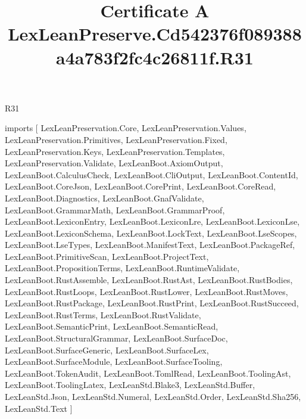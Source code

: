 \begin{lexlean}{R31}
\title{Certificate A LexLeanPreserve.Cd542376f089388a4a783f2fc4c26811f.R31}
\begin{coremodule}
imports [
  LexLeanPreservation.Core,
  LexLeanPreservation.Values,
  LexLeanPreservation.Primitives,
  LexLeanPreservation.Fixed,
  LexLeanPreservation.Keys,
  LexLeanPreservation.Templates,
  LexLeanPreservation.Validate,
  LexLeanBoot.AxiomOutput,
  LexLeanBoot.CalculusCheck,
  LexLeanBoot.CliOutput,
  LexLeanBoot.ContentId,
  LexLeanBoot.CoreJson,
  LexLeanBoot.CorePrint,
  LexLeanBoot.CoreRead,
  LexLeanBoot.Diagnostics,
  LexLeanBoot.GnafValidate,
  LexLeanBoot.GrammarMath,
  LexLeanBoot.GrammarProof,
  LexLeanBoot.LexiconEntry,
  LexLeanBoot.LexiconLre,
  LexLeanBoot.LexiconLse,
  LexLeanBoot.LexiconSchema,
  LexLeanBoot.LockText,
  LexLeanBoot.LseScopes,
  LexLeanBoot.LseTypes,
  LexLeanBoot.ManifestText,
  LexLeanBoot.PackageRef,
  LexLeanBoot.PrimitiveScan,
  LexLeanBoot.ProjectText,
  LexLeanBoot.PropositionTerms,
  LexLeanBoot.RuntimeValidate,
  LexLeanBoot.RustAssemble,
  LexLeanBoot.RustAst,
  LexLeanBoot.RustBodies,
  LexLeanBoot.RustLoops,
  LexLeanBoot.RustLower,
  LexLeanBoot.RustMoves,
  LexLeanBoot.RustPackage,
  LexLeanBoot.RustPrint,
  LexLeanBoot.RustSucceed,
  LexLeanBoot.RustTerms,
  LexLeanBoot.RustValidate,
  LexLeanBoot.SemanticPrint,
  LexLeanBoot.SemanticRead,
  LexLeanBoot.StructuralGrammar,
  LexLeanBoot.SurfaceDoc,
  LexLeanBoot.SurfaceGeneric,
  LexLeanBoot.SurfaceLex,
  LexLeanBoot.SurfaceModule,
  LexLeanBoot.SurfaceTooling,
  LexLeanBoot.TokenAudit,
  LexLeanBoot.TomlRead,
  LexLeanBoot.ToolingAst,
  LexLeanBoot.ToolingLatex,
  LexLeanStd.Blake3,
  LexLeanStd.Buffer,
  LexLeanStd.Json,
  LexLeanStd.Numeral,
  LexLeanStd.Order,
  LexLeanStd.Sha256,
  LexLeanStd.Text
]


\end{coremodule}
\end{lexlean}
